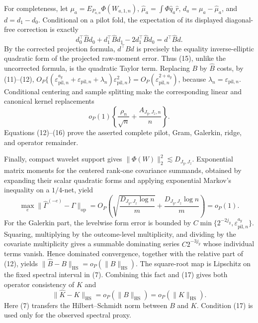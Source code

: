 For completeness, let \(\mu_a=E_{P_{a,n}}\Phi(W_{a,1,n})\), \(\widehat\mu_a=\int\Phi\widehat q_a\widehat r\), \(d_a=\mu_a-\widehat\mu_a\), and \(d=d_1-d_0\).  Conditional on a pilot fold, the expectation of its displayed diagonal-free correction is exactly
\[
d_0^{\top}\widehat Bd_0+d_1^{\top}\widehat Bd_1-2d_1^{\top}\widehat Bd_0
=d^{\top}\widehat Bd.                                                    \tag{15}
\]
By the corrected projection formula, \(d^{\top}Bd\) is precisely the equality inverse-elliptic quadratic form of the projected raw-moment error.  Thus (15), unlike the uncorrected formula, is the quadratic Taylor term.  Replacing \(B\) by \(\widehat B\) costs, by (11)--(12), \(O_P\{(\varepsilon_{\mathrm{pil},n}^{a_y}+\varepsilon_{\mathrm{pil},n}+\lambda_n)\varepsilon_{\mathrm{pil},n}^2\}=O_P(\varepsilon_{\mathrm{pil},n}^{2+a_y})\), because \(\lambda_n=\varepsilon_{\mathrm{pil},n}\).  Conditional centering and sample splitting make the corresponding linear and canonical kernel replacements
\[
o_P(1)\left\{\frac{\rho_n}{\sqrt n}+\frac{A_{J_y,J_z,n}}n\right\}.       \tag{16}
\]
Equations (12)--(16) prove the asserted complete pilot, Gram, Galerkin, ridge, and operator remainder.

Finally, compact wavelet support gives \(\|\Phi(W)\|_2^2\lesssim D_{J_y,J_z}\).  Exponential matrix moments for the centered rank-one covariance summands, obtained by expanding their scalar quadratic forms and applying exponential Markov's inequality on a \(1/4\)-net, yield
\[
\max_e\|\widehat\Gamma^{(-e)}-\Gamma\|_{\mathrm{op}}
=O_P\!\left(\sqrt{\frac{D_{J_y,J_z}\log n}{m}}+
\frac{D_{J_y,J_z}\log n}{m}\right)=o_P(1).                              \tag{17}
\]
For the Galerkin part, the levelwise form error is bounded by \(C\min\{2^{-2j_y},\varepsilon_{\mathrm{pil},n}^{a_y}\}\).  Squaring, multiplying by the outcome-level multiplicity, and dividing by the covariate multiplicity gives a summable dominating series \(C2^{-3j_y}\) whose individual terms vanish.  Hence dominated convergence, together with the relative part of (12), yields \(\|\widehat B-B\|_{\mathrm{HS}}=o_P(\|B\|_{\mathrm{HS}})\).  The square-root map is Lipschitz on the fixed spectral interval in (7).  Combining this fact and (17) gives both operator consistency of \(\widehat K\) and
\[
\|\widehat K-K\|_{\mathrm{HS}}
=o_P(\|B\|_{\mathrm{HS}})=o_P(\|K\|_{\mathrm{HS}}).                    \tag{18}
\]
Here (7) transfers the Hilbert--Schmidt norm between \(B\) and \(K\).  Condition (17) is used only for the observed spectral proxy.